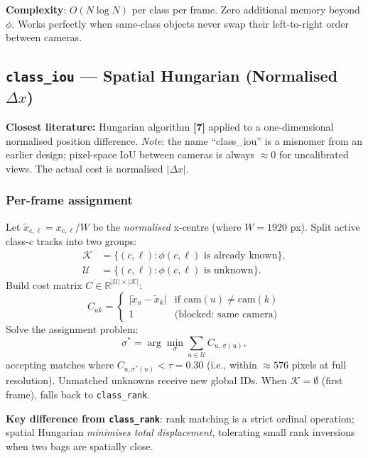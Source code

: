 \documentclass[11pt,a4paper]{article}
\newcommand{\lit}[1]{\textbf{\small[#1]}}
\begin{document}
\textbf{Complexity}: $O(N \log N)$ per class per frame.  Zero additional
memory beyond $\phi$.  Works perfectly when same-class objects never swap
their left-to-right order between cameras.

\subsection{\texttt{class\_iou} — Spatial Hungarian (Normalised $\Delta x$)}

\textbf{Closest literature:} Hungarian algorithm \lit{7} applied to a
one-dimensional normalised position difference.
\textit{Note}: the name ``class\_iou'' is a misnomer from an earlier design;
pixel-space IoU between cameras is always $\approx 0$ for uncalibrated views.
The actual cost is normalised $|\Delta x|$.

\subsubsection*{Per-frame assignment}
Let $\tilde{x}_{c,\ell} = x_{c,\ell} / W$ be the \emph{normalised} x-centre
(where $W = 1920$ px).  Split active class-$c$ tracks into two groups:
\begin{align}
  \mathcal{K} &= \{(c, \ell) : \phi(c,\ell) \text{ is already known}\}, \\
  \mathcal{U} &= \{(c, \ell) : \phi(c,\ell) \text{ is unknown}\}.
\end{align}
Build cost matrix $C \in \mathbb{R}^{|\mathcal{U}| \times |\mathcal{K}|}$:
\begin{equation}
  C_{uk} =
  \begin{cases}
    \bigl|\tilde{x}_u - \tilde{x}_k\bigr|
      & \text{if } \text{cam}(u) \ne \text{cam}(k) \\
    1 & \text{(blocked: same camera)}
  \end{cases}
\end{equation}
Solve the assignment problem:
\begin{equation}
  \sigma^* = \arg\min_{\sigma} \sum_{u \in \mathcal{U}} C_{u,\,\sigma(u)},
\end{equation}
accepting matches where $C_{u,\sigma^*(u)} < \tau = 0.30$
(i.e., within $\approx 576$ pixels at full resolution).  Unmatched unknowns
receive new global IDs.  When $\mathcal{K} = \emptyset$ (first frame), falls
back to \texttt{class\_rank}.

\textbf{Key difference from \texttt{class\_rank}}: rank matching is a strict
ordinal operation; spatial Hungarian \emph{minimises total displacement},
tolerating small rank inversions when two bags are spatially close.
\end{document}
